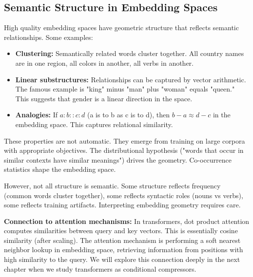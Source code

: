 \vspace{1.5em}

\subsection{Semantic Structure in Embedding Spaces}

High quality embedding spaces have geometric structure that reflects semantic relationships. Some examples:

\begin{itemize}
\item \textbf{Clustering:} Semantically related words cluster together. All country names are in one region, all colors in another, all verbs in another.

\item \textbf{Linear substructures:} Relationships can be captured by vector arithmetic. The famous example is "king" minus "man" plus "woman" equals "queen." This suggests that gender is a linear direction in the space.

\item \textbf{Analogies:} If $a : b :: c : d$ (a is to b as c is to d), then $b - a \approx d - c$ in the embedding space. This captures relational similarity.
\end{itemize}

\vspace{1em}

These properties are not automatic. They emerge from training on large corpora with appropriate objectives. The distributional hypothesis ("words that occur in similar contexts have similar meanings") drives the geometry. Co-occurrence statistics shape the embedding space.

\vspace{1em}

However, not all structure is semantic. Some structure reflects frequency (common words cluster together), some reflects syntactic roles (nouns vs verbs), some reflects training artifacts. Interpreting embedding geometry requires care.

\vspace{1em}

\textbf{Connection to attention mechanisms:} In transformers, dot product attention computes similarities between query and key vectors. This is essentially cosine similarity (after scaling). The attention mechanism is performing a soft nearest neighbor lookup in embedding space, retrieving information from positions with high similarity to the query. We will explore this connection deeply in the next chapter when we study transformers as conditional compressors.

